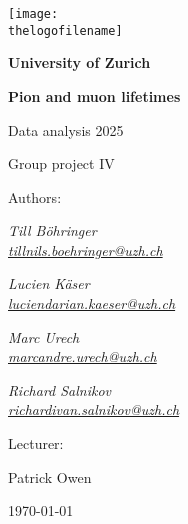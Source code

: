 \begin{titlepage}
    \setlength{\headheight}{0cm}
	\texttt{[image: \\thelogofilename]}\par\vspace{1cm}
	
	\centering
	
	{\bfseries\LARGE University of Zurich\par}
	\vspace{0.7cm}
	
	{\Huge\bfseries Pion and muon lifetimes\par}
	\vspace{0.7cm}

	{\LARGE Data analysis 2025 \par Group project IV \par }
	\vfill

    {\large Authors:\par\vspace{0.2cm}}
	{\Large\itshape Till Böhringer\\ \href{mailto:tillnils.boehringer@uzh.ch}{tillnils.boehringer@uzh.ch} \par
	\Large\itshape Lucien Käser\\ \href{mailto:luciendarian.kaeser@uzh.ch}{luciendarian.kaeser@uzh.ch} \par
	\Large\itshape Marc Urech\\ \href{mailto:marcandre.urech@uzh.ch}{marcandre.urech@uzh.ch} \par
	\Large\itshape Richard Salnikov\\ \href{mailto:richardivan.salnikov@uzh.ch}{richardivan.salnikov@uzh.ch} \par}
	\vfill

	
	{\large Lecturer:\par\vspace{0.2cm}}
	{\Large Patrick Owen}
	\vfill
	\vfill

	{\large \today\par}
\end{titlepage}
\restoregeometry %